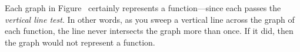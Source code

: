
  Each graph in
Figure~
certainly represents a function---since each passes the {\em vertical
line test}.  In other words, as you sweep a vertical line across the graph
of each function, the line never intersects the graph more than once.  If
it did, then the graph would not represent a function.

